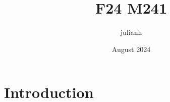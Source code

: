\documentclass{article}
\title{F24 M241}
\author{julianh }
\date{August 2024}
\begin{document}
\maketitle

\section{Introduction}
\end{document}
